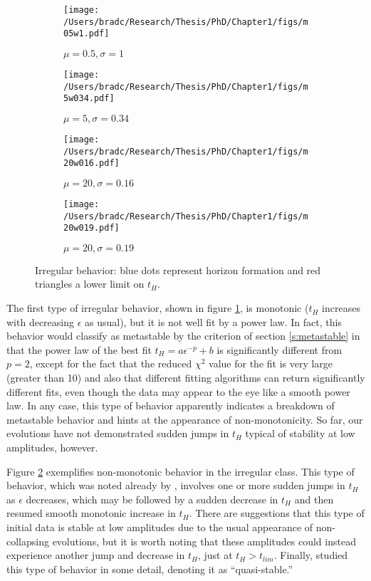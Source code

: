 \documentclass[../PhD.tex]{subfiles}
\begin{document}
\begin{figure}[!t]
\centering
\begin{subfigure}[t]{0.47\textwidth}
\texttt{[image: /Users/bradc/Research/Thesis/PhD/Chapter1/figs/m05w1.pdf]}
\caption{$\mu=0.5,\sigma=1$}
\label{f:m05w1}
\end{subfigure}\hfill
\begin{subfigure}[t]{0.47\textwidth}
\texttt{[image: /Users/bradc/Research/Thesis/PhD/Chapter1/figs/m5w034.pdf]}
\caption{$\mu=5,\sigma=0.34$}
\label{f:m5w034}
\end{subfigure}
\begin{subfigure}[t]{0.47\textwidth}
\texttt{[image: /Users/bradc/Research/Thesis/PhD/Chapter1/figs/m20w016.pdf]}
\caption{$\mu=20,\sigma=0.16$}
\label{f:m20w016}
\end{subfigure}\hfill
\begin{subfigure}[t]{0.47\textwidth}
\texttt{[image: /Users/bradc/Research/Thesis/PhD/Chapter1/figs/m20w019.pdf]}
\caption{$\mu=20,\sigma=0.19$}
\label{f:m20w019}
\end{subfigure}
\caption[Horizon formation times for irregular initial data]{Irregular behavior: blue dots represent horizon formation and
red triangles a lower limit on $t_H$.
}
\label{f:irregular}
\end{figure}

The first type of irregular behavior, shown in figure \ref{f:m05w1}, is
monotonic ($t_H$ increases with decreasing $\epsilon$ as usual), but it is
not well fit by a power law.  In fact, this behavior would classify as
metastable by the criterion of section \ref{s:metastable} in that the
power law of the best fit $t_H=a\epsilon^{-p}+b$ is significantly different
from $p=2$, except for the fact that the reduced $\chi^2$ value for the
fit is very large (greater than 10)
and also that different fitting algorithms can return
significantly different fits, even though the data may appear to the eye
like a smooth power law.  In any case, this type of behavior apparently
indicates a breakdown of metastable behavior and hints at the appearance of
non-monotonicity.  So far, our evolutions have not demonstrated sudden jumps
in $t_H$ typical of stability at low amplitudes, however.

Figure \ref{f:m5w034} exemplifies non-monotonic behavior in the irregular
class.  This type of behavior, which was noted already by \cite{1304.4166},
involves one or more sudden jumps in $t_H$ as $\epsilon$ decreases,
which may be followed by a sudden decrease in $t_H$ and then resumed smooth
monotonic increase in $t_H$.  There are suggestions that this type of
initial data is stable at low amplitudes due to the usual appearance of
non-collapsing evolutions, but it is worth noting that these amplitudes could
instead experience another jump and decrease in $t_H$, just at $t_H>t_{lim}$.
Finally, \cite{1508.02709} studied this type of behavior in some detail,
denoting it as ``quasi-stable.''
\end{document}
